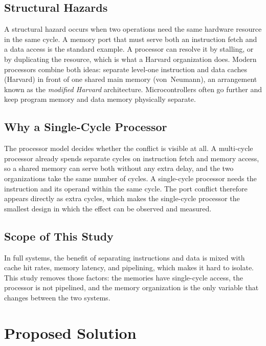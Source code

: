 \documentclass[conference]{IEEEtran}
\begin{document}
\subsection{Structural Hazards}
A structural hazard occurs when two operations need the same hardware resource in the same cycle.
A memory port that must serve both an instruction fetch and a data access is the standard example.
A processor can resolve it by stalling, or by duplicating the resource, which is what a Harvard
organization does. Modern processors combine both ideas: separate level-one instruction and data
caches (Harvard) in front of one shared main memory (von~Neumann), an arrangement known as the
\emph{modified Harvard} architecture. Microcontrollers often go further and keep program memory and
data memory physically separate.

\subsection{Why a Single-Cycle Processor}
The processor model decides whether the conflict is visible at all. A multi-cycle processor
already spends separate cycles on instruction fetch and memory access, so a shared memory can
serve both without any extra delay, and the two organizations take the same number of cycles. A
single-cycle processor needs the instruction and its operand within the same cycle. The port
conflict therefore appears directly as extra cycles, which makes the single-cycle processor the
smallest design in which the effect can be observed and measured.

\subsection{Scope of This Study}
In full systems, the benefit of separating instructions and data is mixed with cache hit rates,
memory latency, and pipelining, which makes it hard to isolate. This study removes those factors:
the memories have single-cycle access, the processor is not pipelined, and the memory organization
is the only variable that changes between the two systems.

\section{Proposed Solution}
\label{sec:solution}
\end{document}
